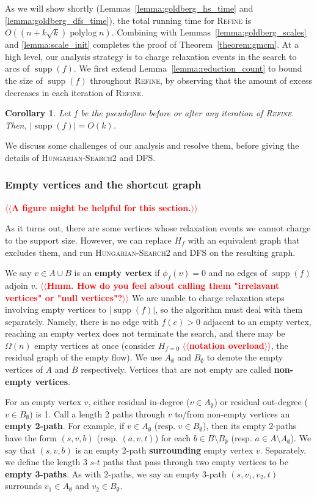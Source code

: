 \documentclass[11pt]{article}
\makeatletter
\def\polylog{\mathop{\mathrm{polylog}}}
\def\fsupply{\phi}
\def\supp{\operatorname{supp}}
\theoremstyle{plain}
\newtheorem{corollary}[lemma]{Corollary}
\numberwithin{figure}{section}
\def\EMPH#1{\textbf{\boldmath #1}}
\def\n@te#1{\textsf{\boldmath \textbf{$\langle\!\langle$#1$\rangle\!\rangle$}}\leavevmode}
\def\note#1{\textcolor{red}{\n@te{#1}}}
\makeatother
\begin{document}
As we will show shortly (Lemmas~\ref{lemma:goldberg_hs_time} and \ref{lemma:goldberg_dfs_time}), the total running time for \textsc{Refine} is
$O((n + k\sqrt{k})\polylog n)$.
Combining with Lemmas~\ref{lemma:goldberg_scales} and \ref{lemma:scale_init}
completes the proof of Theorem~\ref{theorem:gmcm}.
At a high level, our analysis strategy is to charge relaxation events in
the search to arcs of $\supp(f)$.
We first extend Lemma~\ref{lemma:reduction_count} to bound the size of
$\supp(f)$ throughout \textsc{Refine}, by observing that the amount of excess
decreases in each iteration of \textsc{Refine}.

\begin{corollary}
\label{corollary:support_size_during}
Let $f$ be the pseudoflow before or after any iteration of \textsc{Refine}.
Then, $|\supp(f)| = O(k)$.
\end{corollary}

We discuss some challenges of our analysis and resolve them, before giving
the details of \textsc{Hungarian-Search2} and \textsc{DFS}.

\subsubsection{Empty vertices and the shortcut graph}

\note{A figure might be helpful for this section.}

As it turns out, there are some vertices whose relaxation events we cannot
charge to the support size.
However, we can replace $H_f$ with an equivalent graph that excludes them,
and run \textsc{Hungarian-Search2} and \textsc{DFS} on the resulting graph.

We say $v \in A \cup B$ is an \EMPH{empty vertex} if $\fsupply_f(v) = 0$ and no edges
of $\supp(f)$ adjoin $v$.
\note{Hmm. How do you feel about calling them "irrelavant vertices" or "null vertices"?}
We are unable to charge relaxation steps involving empty vertices to
$|\supp(f)|$, so the algorithm must deal with them separately.
Namely, there is no edge with $f(e) > 0$ adjacent to an empty vertex,
reaching an empty vertex does not terminate the search, and there may be
$\Omega(n)$ empty vertices at once (consider $H_{f = 0}$ \note{notation overload}, the residual graph
of the empty flow).
We use $A_\emptyset$ and $B_\emptyset$ to denote the empty vertices of $A$ and
$B$ respectively.
Vertices that are not empty are called \EMPH{non-empty vertices}.

For an empty vertex $v$, either residual in-degree ($v \in A_\emptyset$) or
residual out-degree ($v \in B_\emptyset$) is 1.
Call a length 2 paths through $v$ to/from non-empty vertices an
\EMPH{empty 2-path}.
For example, if $v \in A_\emptyset$ (resp. $v \in B_\emptyset$), then its empty
2-paths have the form $(s, v, b)$ (resp. $(a, v, t)$) for each
$b \in B \setminus B_\emptyset$ (resp. $a \in A \setminus A_\emptyset$).
We say that $(s, v, b)$ is an empty 2-path \EMPH{surrounding} empty vertex $v$.
Separately, we define the length 3 $s$-$t$ paths that pass through two empty
vertices to be \EMPH{empty 3-paths}.
As with 2-paths, we say an empty 3-path $(s, v_1, v_2, t)$ surrounds
$v_1 \in A_\emptyset$ and $v_2 \in B_\emptyset$.
\end{document}
